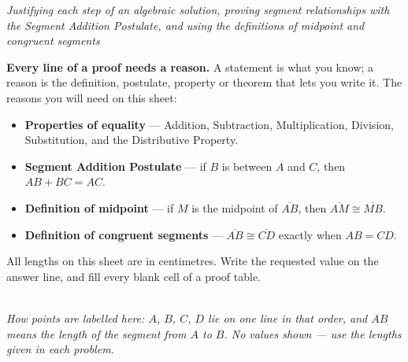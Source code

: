 \documentclass[12pt]{article}
\begin{document}

\begin{center}
\textit{Justifying each step of an algebraic solution, proving segment
relationships with the Segment Addition Postulate, and using the definitions of
midpoint and congruent segments}
\end{center}

\noindent\small
\textbf{Every line of a proof needs a reason.} A statement is what you know; a
reason is the definition, postulate, property or theorem that lets you write
it. The reasons you will need on this sheet:
\begin{itemize}[leftmargin=1.1cm, itemsep=1pt, topsep=2pt]
  \item \textbf{Properties of equality} --- Addition, Subtraction,
        Multiplication, Division, Substitution, and the Distributive Property.
  \item \textbf{Segment Addition Postulate} --- if $B$ is between $A$ and $C$,
        then $AB + BC = AC$.
  \item \textbf{Definition of midpoint} --- if $M$ is the midpoint of
        $\overline{AB}$, then $\overline{AM} \cong \overline{MB}$.
  \item \textbf{Definition of congruent segments} --- $\overline{AB} \cong
        \overline{CD}$ exactly when $AB = CD$.
\end{itemize}
All lengths on this sheet are in centimetres. Write the requested value on the
answer line, and fill every blank cell of a proof table.
\normalsize

\begin{center}
\\
{\small\textit{How points are labelled here: $A$, $B$, $C$, $D$ lie on one line
in that order, and $AB$ means the length of the segment from $A$ to $B$. No
values shown --- use the lengths given in each problem.}}
\end{center}

\vspace{0.2cm}

\end{document}
